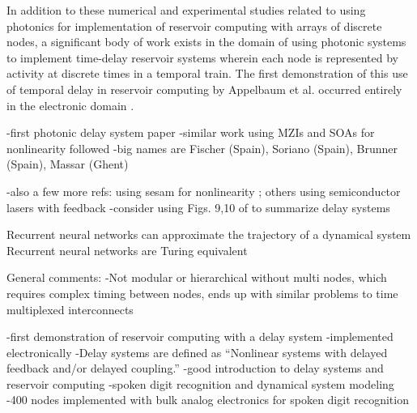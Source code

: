 In addition to these numerical and experimental studies related to using photonics for implementation of reservoir computing with arrays of discrete nodes, a significant body of work exists in the domain of using photonic systems to implement time-delay reservoir systems wherein each node is represented by activity at discrete times in a temporal train. The first demonstration of this use of temporal delay in reservoir computing by Appelbaum et al. occurred entirely in the electronic domain \cite{apso2011}.

-first photonic delay system paper \cite{laso2012}
-similar work using MZIs and SOAs for nonlinearity followed
-big names are Fischer (Spain), Soriano (Spain), Brunner (Spain), Massar (Ghent)




-also a few more refs: using sesam for nonlinearity \cite{dedu2014}; others using semiconductor lasers with feedback \cite{ngve2014}
-consider using Figs. 9,10 of \cite{vabr2017} to summarize delay systems






\vspace{3em}
Recurrent neural networks can approximate the trajectory of a dynamical system \cite{funa1993}
Recurrent neural networks are Turing equivalent \cite{kisi1996}

\vspace{3em}
\cite{jaha2004}

\vspace{3em}


\vspace{3em}
\cite{vabr2017}


General comments:
-Not modular or hierarchical without multi nodes, which requires complex timing between nodes, ends up with similar problems to time multiplexed interconnects

\vspace{3em}
\cite{apso2011}
-first demonstration of reservoir computing with a delay system
-implemented electronically
-Delay systems are defined as ``Nonlinear systems with delayed feedback and/or delayed coupling.''
-good introduction to delay systems and reservoir computing
-spoken digit recognition and dynamical system modeling
-400 nodes implemented with bulk analog electronics for spoken digit recognition

